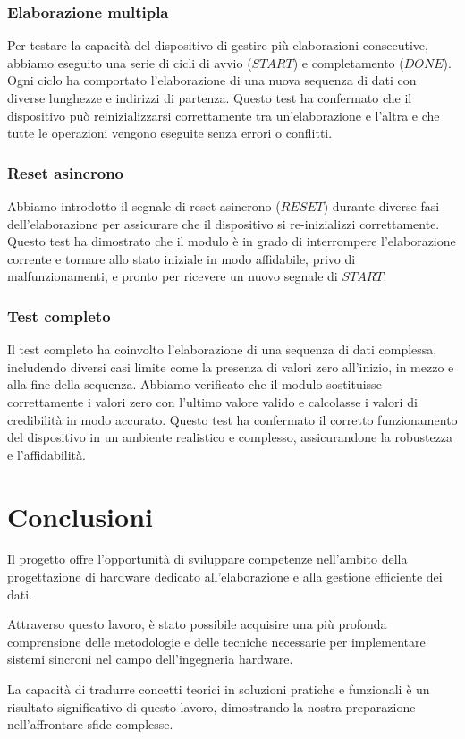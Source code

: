 \subsubsection{Elaborazione multipla}
  Per testare la capacità del dispositivo di gestire più elaborazioni consecutive, abbiamo eseguito una serie di cicli di avvio ($START$) e completamento ($DONE$).
  Ogni ciclo ha comportato l'elaborazione di una nuova sequenza di dati con diverse lunghezze e indirizzi di partenza.
  Questo test ha confermato che il dispositivo può reinizializzarsi correttamente tra un'elaborazione e l'altra e che tutte le operazioni vengono eseguite senza errori o conflitti.
\subsubsection{Reset asincrono}
  Abbiamo introdotto il segnale di reset asincrono ($RESET$) durante diverse fasi dell'elaborazione per assicurare che il dispositivo si re-inizializzi correttamente.
  Questo test ha dimostrato che il modulo è in grado di interrompere l'elaborazione corrente e tornare allo stato iniziale in modo affidabile, privo di malfunzionamenti, e pronto per ricevere un nuovo segnale di $START$.
\subsubsection{Test completo}
  Il test completo ha coinvolto l'elaborazione di una sequenza di dati complessa, includendo diversi casi limite come la presenza di valori zero all'inizio, in mezzo e alla fine della sequenza.
  Abbiamo verificato che il modulo sostituisse correttamente i valori zero con l'ultimo valore valido e calcolasse i valori di credibilità in modo accurato.
  Questo test ha confermato il corretto funzionamento del dispositivo in un ambiente realistico e complesso, assicurandone la robustezza e l'affidabilità.
\pagebreak

\section{Conclusioni}
  \par Il progetto offre l'opportunità di sviluppare competenze nell'ambito della progettazione di hardware dedicato all'elaborazione e alla gestione efficiente dei dati.
  \par Attraverso questo lavoro, è stato possibile acquisire una più profonda comprensione delle metodologie e delle tecniche necessarie per implementare sistemi sincroni nel campo dell'ingegneria hardware.
  \par La capacità di tradurre concetti teorici in soluzioni pratiche e funzionali è un risultato significativo di questo lavoro, dimostrando la nostra preparazione nell'affrontare sfide complesse.
\pagebreak
